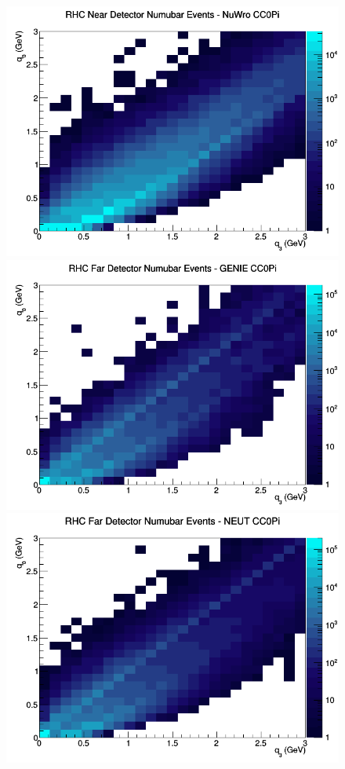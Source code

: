 \begin{figure}[h]
\includegraphics[width=\linewidth]{eff_q0_q3/GAr/CC0Pi_RHC_ND_numubar_q3_q0_NuWro.png}
\endminipage
\newline
{}
\includegraphics[width=\linewidth]{eff_q0_q3/GAr/CC0Pi_RHC_FD_numubar_q3_q0_GENIE.png}
\endminipage
{}
\includegraphics[width=\linewidth]{eff_q0_q3/GAr/CC0Pi_RHC_FD_numubar_q3_q0_NEUT.png}

\end{figure}
